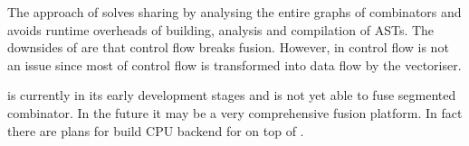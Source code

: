 \documentclass[preamble.tex]{subfiles}
\begin{document}
The approach of \FlowFusion solves sharing by analysing the entire graphs of combinators and avoids runtime overheads of building, analysis and compilation of ASTs. The downsides of \FlowFusion are that control flow breaks fusion. However, in \DPH control flow is not an issue since most of control flow is transformed into data flow by the vectoriser.

\FlowFusion is currently in its early development stages and is not yet able to fuse segmented combinator. In the future it may be a very comprehensive fusion platform. In fact there are plans for build CPU backend for \Accelerate on top of \FlowFusion.

\end{document}
